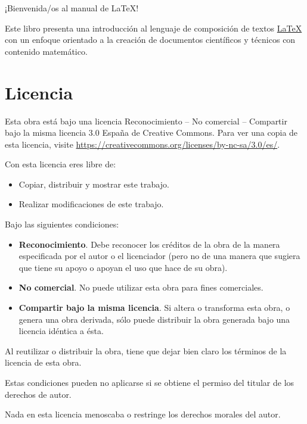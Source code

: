 \documentclass[
  a4paper,
]{scrreport}
\providecommand{\tightlist}{%
  \setlength{\itemsep}{0pt}\setlength{\parskip}{0pt}}\usepackage{longtable,booktabs,array}
\theoremstyle{definition}
\theoremstyle{remark}
\begin{document}

¡Bienvenida/os al manual de \LaTeX!

Este libro presenta una introducción al lenguaje de composición de
textos \href{https://www.latex-project.org/}{\LaTeX} con un enfoque
orientado a la creación de documentos científicos y técnicos con
contenido matemático.

\section*{Licencia}\label{licencia}


Esta obra está bajo una licencia Reconocimiento -- No comercial --
Compartir bajo la misma licencia 3.0 España de Creative Commons. Para
ver una copia de esta licencia, visite
\url{https://creativecommons.org/licenses/by-nc-sa/3.0/es/}.

Con esta licencia eres libre de:

\begin{itemize}
\tightlist
\item
  Copiar, distribuir y mostrar este trabajo.
\item
  Realizar modificaciones de este trabajo.
\end{itemize}

Bajo las siguientes condiciones:

\begin{itemize}
\item
  \textbf{Reconocimiento}. Debe reconocer los créditos de la obra de la
  manera especificada por el autor o el licenciador (pero no de una
  manera que sugiera que tiene su apoyo o apoyan el uso que hace de su
  obra).
\item
  \textbf{No comercial}. No puede utilizar esta obra para fines
  comerciales.
\item
  \textbf{Compartir bajo la misma licencia}. Si altera o transforma esta
  obra, o genera una obra derivada, sólo puede distribuir la obra
  generada bajo una licencia idéntica a ésta.
\end{itemize}

Al reutilizar o distribuir la obra, tiene que dejar bien claro los
términos de la licencia de esta obra.

Estas condiciones pueden no aplicarse si se obtiene el permiso del
titular de los derechos de autor.

Nada en esta licencia menoscaba o restringe los derechos morales del
autor.
\end{document}
